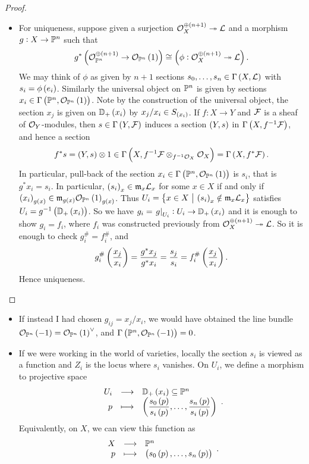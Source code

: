 \begin{proof}
\begin{itemize}
\begin{itemize}
\item For uniqueness, suppose given a surjection $ \OOO_X^{\oplus \br{n + 1}} \twoheadrightarrow \LLL $ and a morphism $ g : X \to \mathbb{P}^n $ such that
$$ g^*\br{\OOO_{\PP^n}^{\oplus \br{n + 1}} \to \OOO_{\PP^n}\br{1}} \cong \br{\phi : \OOO_X^{\oplus \br{n + 1}} \twoheadrightarrow \LLL}. $$
We may think of $ \phi $ as given by $ n + 1 $ sections $ s_0, \dots, s_n \in \Gamma\br{X, \LLL} $ with $ s_i = \phi\br{e_i} $. Similarly the universal object on $ \mathbb{P}^n $ is given by sections $ x_i \in \Gamma\br{\PP^n, \OOO_{\PP^n}\br{1}} $. Note by the construction of the universal object, the section $ x_j $ is given on $ \DD_+\br{x_i} $ by $ x_j / x_i \in S_{\br{x_i}} $. If $ f : X \to Y $ and $ \mathcal{F} $ is a sheaf of $ \mathcal{O}_Y $-modules, then $ s \in \Gamma\br{Y, \FFF} $ induces a section $ \br{Y, s} $ in $ \Gamma\br{X, f^{-1}\FFF} $, and hence a section
$$ f^*s = \br{Y, s} \otimes 1 \in \Gamma\br{X, f^{-1}\FFF \otimes_{f^{-1}\OOO_X} \OOO_X} = \Gamma\br{X, f^*\FFF}. $$
In particular, pull-back of the section $ x_i \in \Gamma\br{\PP^n, \OOO_{\PP^n}\br{1}} $ is $ s_i $, that is $ g^*x_i = s_i $. In particular, $ \br{s_i}_x \in \mmm_x\LLL_x $ for some $ x \in X $ if and only if $ \br{x_i}_{g\br{x}} \in \mmm_{g\br{x}}\OOO_{\PP^n}\br{1}_{g\br{x}} $. Thus $ U_i = \cbr{x \in X \st \br{s_i}_x \notin \mmm_x\LLL_x} $ satisfies $ U_i = g^{-1}\br{\DD_+\br{x_i}} $. So we have $ g_i = \eval{g}_{U_i} : U_i \to \DD_+\br{x_i} $ and it is enough to show $ g_i = f_i $, where $ f_i $ was constructed previously from $ \OOO_X^{\oplus \br{n + 1}} \twoheadrightarrow \LLL $. So it is enough to check $ g_i^\# = f_i^\# $, and
$$ g_i^\#\br{\dfrac{x_j}{x_i}} = \dfrac{g^*x_j}{g^*x_i} = \dfrac{s_j}{s_i} = f_i^\#\br{\dfrac{x_j}{x_i}}. $$
Hence uniqueness.
\end{itemize}
\end{itemize}
\end{proof}

\begin{remark*}
\hfill
\begin{itemize}
\item If instead I had chosen $ g_{ij} = x_j / x_i $, we would have obtained the line bundle $ \OOO_{\PP^n}\br{-1} = \OOO_{\PP^n}\br{1}^\vee $, and $ \Gamma\br{\PP^n, \OOO_{\PP^n}\br{-1}} = 0 $.
\item If we were working in the world of varieties, locally the section $ s_i $ is viewed as a function and $ Z_i $ is the locus where $ s_i $ vanishes. On $ U_i $, we define a morphism to projective space
$$ \function{U_i}{\DD_+\br{x_i} \subseteq \PP^n}{p}{\br{\dfrac{s_0\br{p}}{s_i\br{p}}, \dots, \dfrac{s_n\br{p}}{s_i\br{p}}}}. $$
Equivalently, on $ X $, we can view this function as
$$ \function{X}{\PP^n}{p}{\br{s_0\br{p}, \dots, s_n\br{p}}}. $$
\end{itemize}
\end{remark*}

